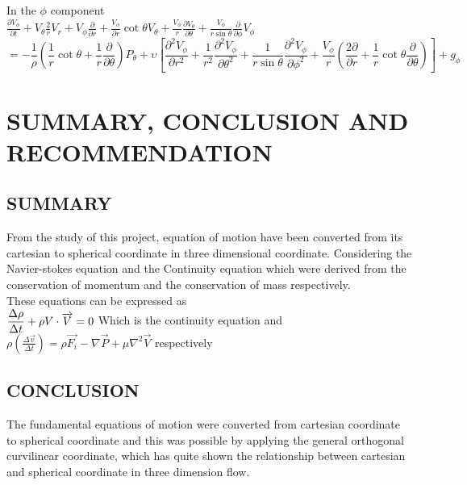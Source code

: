 \documentclass[12pt]{report}
\newcommand{\sps}{\\[0.2cm]}
\newcommand{\NI}{\noindent}
\newcommand{\dsp}{\displaystyle}
\begin{document}
 	\NI In the $\phi$ component
 	\sps
 	$\dsp
 	\frac{\partial V_\phi}{\partial t} + V_\theta \frac{2}{r}V_r + V_\phi \frac{\partial}{\partial r} + \frac{V_\phi}{\partial r}\cot\theta V_\theta + \frac{V_\phi}{r}\frac{\partial V_\theta}{\partial\theta} + \frac{V_\phi}{r\sin\theta}\frac{\partial}{\partial\phi}V_\phi
 	$
 	\begin{equation}
 		= - \frac{1}{\rho}\left(\frac{1}{r}\cot\theta + \frac{1}{r}\frac{\partial}{\partial \theta}\right)P_\theta + \upsilon \left[\frac{\partial^2V_\phi}{\partial r^2} + \frac{1}{r^2}\frac{\partial^2V_\phi}{\partial\theta^2} + \frac{1}{r\sin\theta}\frac{\partial^2V_\phi}{\partial\phi^2} + \frac{V_\phi}{r}\left(\frac{2\partial}{\partial r} + \frac{1}{r}\cot\theta\frac{\partial}{\partial\theta}\right)\right] + g_\phi
 	\end{equation}
 
 

	\chapter{SUMMARY, CONCLUSION AND RECOMMENDATION}
	
	\section{SUMMARY}
	From the study of this project, equation of motion have been converted from its cartesian to spherical coordinate in three dimensional coordinate. Considering the Navier-stokes equation and the Continuity equation which were derived from the conservation of momentum and the conservation of mass respectively.\sps
	
	\NI These equations can be expressed as\sps
	$\dsp
		\frac{\Delta \rho}{\Delta t} + \rho V \cdot \overrightarrow{V} = 0 \sps
	$
	Which is the continuity equation and\sps
	$\dsp
		\rho\left(\frac{\Delta\overrightarrow{v}}{\Delta t}\right) = \rho \overrightarrow{F_i} - \nabla \overrightarrow{P} + \mu \nabla^2\overrightarrow{V}
	$
	respectively
	
	
	\section{CONCLUSION}
	The fundamental equations of motion were converted from cartesian coordinate to spherical coordinate and this was possible by applying the general orthogonal curvilinear coordinate, which has quite shown the relationship between cartesian and spherical coordinate in three dimension flow.
	
\end{document}
